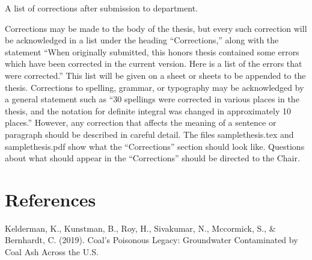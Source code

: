 \documentclass[12pt, twoside]{amherstthesis}
\newlength{\cslhangindent}
\newenvironment{cslreferences}%
  {\setlength{\parindent}{0pt}%
  \everypar{\setlength{\hangindent}{\cslhangindent}}\ignorespaces}%
  {\par}
\begin{document}
A list of corrections after submission to department.

Corrections may be made to the body of the thesis, but every such correction will be acknowledged in a list under the heading ``Corrections,'' along with the statement ``When originally submitted, this honors thesis contained some errors which have been corrected in the current version. Here is a list of the errors that were corrected.'' This list will be given on a sheet or sheets to be appended to the thesis. Corrections to spelling, grammar, or typography may be acknowledged by a general statement such as ``30 spellings were corrected in various places in the thesis, and the notation for definite integral was changed in approximately 10 places.'' However, any correction that affects the meaning of a sentence or paragraph should be described in careful detail. The files samplethesis.tex and samplethesis.pdf show what the ``Corrections'' section should look like. Questions about what should appear in the ``Corrections'' should be directed to the Chair.

\backmatter

\hypertarget{references}{%
\chapter*{References}\label{references}}

\noindent

\setlength{\parindent}{-0.20in}
\setlength{\leftskip}{0.20in}
\setlength{\parskip}{8pt}

\hypertarget{refs}{}
\begin{cslreferences}
\leavevmode\hypertarget{ref-Kelderman2019}{}%
Kelderman, K., Kunstman, B., Roy, H., Sivakumar, N., Mccormick, S., \& Bernhardt, C. (2019). Coal's Poisonous Legacy: Groundwater Contaminated by Coal Ash Across the U.S.
\end{cslreferences}
\end{document}

